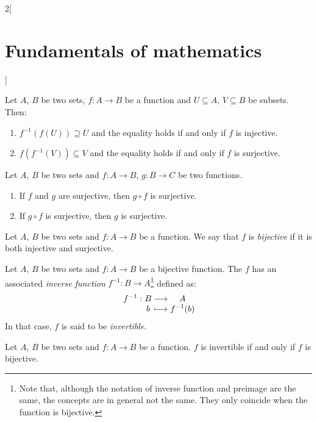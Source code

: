 \documentclass[../../../main.tex]{subfiles}
\begin{document}
\begin{multicols}{2}[\section{Fundamentals of mathematics}]
\begin{definition}
  \end{definition}
  \begin{proposition}
    Let $A$, $B$ be two sets, $f:A\rightarrow B$ be a function and $U\subseteq A$, $V\subseteq B$ be subsets. Then:
    \begin{enumerate}
      \item $f^{-1}(f(U))\supseteq U$ and the equality holds if and only if $f$ is injective.
      \item $f(f^{-1}(V))\subseteq V$ and the equality holds if and only if $f$ is surjective.
    \end{enumerate}
  \end{proposition}
  \begin{proposition}
    Let $A$, $B$ be two sets and $f:A\rightarrow B$, $g:B\rightarrow C$ be two functions.
    \begin{enumerate}
      \item If $f$ and $g$ are surjective, then $g\circ f$ is surjective.
      \item If $g\circ f$ is surjective, then $g$ is surjective.
    \end{enumerate}
  \end{proposition}
  \begin{definition}
    Let $A$, $B$ be two sets and $f:A\rightarrow B$ be a function. We say that $f$ is \emph{bijective} if it is both injective and surjective.
  \end{definition}
  \begin{proposition}
    Let $A$, $B$ be two sets and $f:A\rightarrow B$ be a bijective function. The $f$ has an associated \emph{inverse function} $f^{-1}:B\rightarrow A$\footnote{Note that, although the notation of inverse function and preimage are the same, the concepts are in general not the same. They only coincide when the function is bijective.} defined as:
    $$\function{f^{-1}}{B}{A}{b}{f^{-1}(b)}$$
    In that case, $f$ is said to be \emph{invertible}.
  \end{proposition}
  \begin{theorem}
    Let $A$, $B$ be two sets and $f:A\rightarrow B$ be a function. $f$ is invertible if and only if $f$ is bijective.
  \end{theorem}

\end{multicols}
\end{document}
